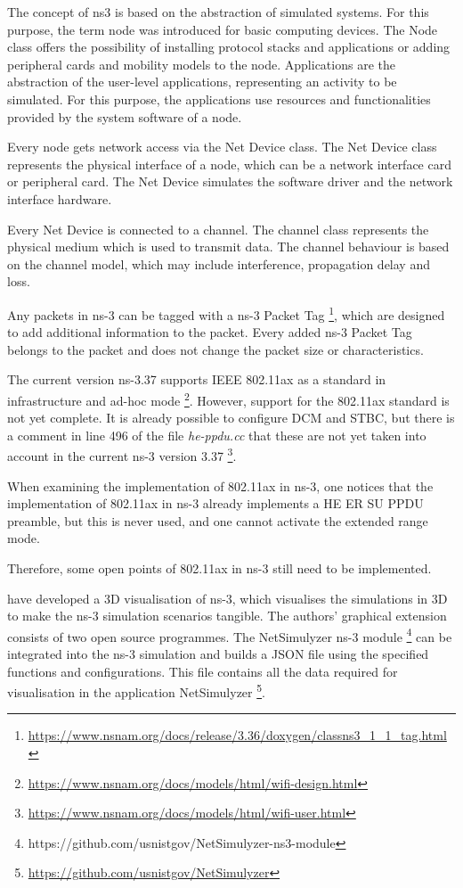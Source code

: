 The concept of ns3 is based on the abstraction of simulated systems.
For this purpose, the term node was introduced for basic computing devices.
The Node class offers the possibility of installing protocol stacks and applications or adding peripheral cards and mobility models to the node.
Applications are the abstraction of the user-level applications, representing an activity to be simulated.
For this purpose, the applications use resources and functionalities provided by the system software of a node.

Every node gets network access via the Net Device class.
The Net Device class represents the physical interface of a node,
which can be a network interface card or peripheral card.
The Net Device simulates the software driver and the network interface hardware.

Every Net Device is connected to a channel.
The channel class represents the physical medium which is used to transmit data.
The channel behaviour is based
on the channel model, which may include interference, propagation delay and loss.

Any packets in ns-3 can be tagged with a ns-3 Packet Tag \footnote{\url{https://www.nsnam.org/docs/release/3.36/doxygen/classns3_1_1_tag.html}},
which are designed to add additional information to the packet.
Every added ns-3 Packet Tag belongs to the packet and does not change the packet size or characteristics.

The current version ns-3.37 supports IEEE 802.11ax as a standard in infrastructure and ad-hoc mode \footnote{\url{https://www.nsnam.org/docs/models/html/wifi-design.html}}.
However, support for the 802.11ax standard is not yet complete.
It is already possible to configure \ac{DCM} and \ac{STBC},
but there is a comment in line 496 of the file \textit{he-ppdu.cc} that these are
not yet taken into account in the current ns-3 version 3.37 \footnote{\url{https://www.nsnam.org/docs/models/html/wifi-user.html}}.

When examining the implementation of 802.11ax in ns-3, one notices that the implementation of 802.11ax
in ns-3 already implements a \ac{HE} \ac{ER} SU \ac{PPDU} preamble, but this is never used,
and one cannot activate the extended range mode.

Therefore, some open points of 802.11ax in ns-3 still need to be implemented.

\textcite{black_netsimulyzer_2021} have developed a 3D visualisation of ns-3, which visualises the simulations in 3D to make the ns-3 simulation
scenarios tangible.
The authors' graphical extension consists of two open source programmes.
The NetSimulyzer ns-3 module \footnote{https://github.com/usnistgov/NetSimulyzer-ns3-module} can be integrated into the ns-3 simulation and builds a JSON file using the specified functions and configurations.
This file contains all the data required for visualisation in the application NetSimulyzer \footnote{\url{https://github.com/usnistgov/NetSimulyzer}}.

